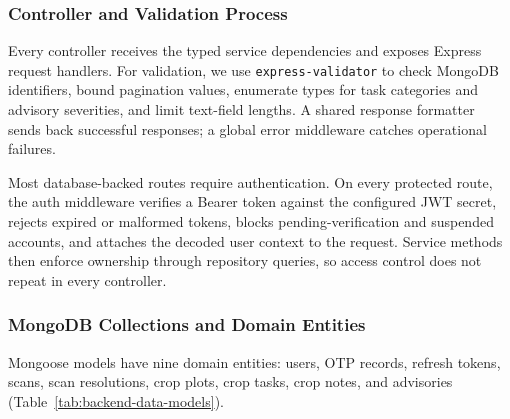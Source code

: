 \subsubsection{Controller and Validation Process}

Every controller receives the typed service dependencies and exposes Express request handlers. For
validation, we use \texttt{express-validator} to check MongoDB identifiers, bound pagination
values, enumerate types for task categories and advisory severities, and limit text-field
lengths. A shared response formatter sends back successful responses; a global error
middleware catches operational failures.

Most database-backed routes require authentication. On every protected route, the auth
middleware verifies a Bearer token against the configured JWT secret, rejects expired or
malformed tokens, blocks pending-verification and suspended accounts, and attaches the decoded
user context to the request. Service methods then enforce ownership through repository
queries, so access control does not repeat in every controller.


\subsubsection{MongoDB Collections and Domain Entities}

Mongoose models have nine domain entities: users, OTP records, refresh tokens, scans, scan
resolutions, crop plots, crop tasks, crop notes, and advisories
(Table~\ref{tab:backend-data-models}). 

